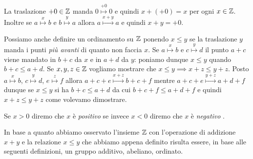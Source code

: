 La traslazione $+0\in {\mathbb Z}$ manda $0\stackrel{+0}\mapsto 0$ 
e quindi $x+(+0)=x$ per ogni $x\in {\mathbb Z}$.
Inoltre se $a\stackrel x\mapsto b$ e $b\stackrel y \mapsto a$ 
allora $a \stackrel{x+y} \mapsto a$ e quindi $x+y = +0$.

Possiamo anche definire un ordinamento su ${\mathbb Z}$ ponendo $x\le y$ 
se la traslazione $y$ manda i punti \emph{più avanti} di quanto 
non faccia $x$. 
Se $a\stackrel x\mapsto b$ e $c\stackrel y\mapsto d$ 
il punto $a+c$ viene mandato in $b+c$ da $x$ e in $a+d$ da $y$:
poniamo dunque $x\le y$ quando $b+c\le a+d$.
Se $x,y,z\in {\mathbb Z}$ vogliamo mostrare 
che $x\le y \implies x+z\le y+z$.
Posto $a\stackrel x\mapsto b$, $c\stackrel y\mapsto d$, 
$e\stackrel z\mapsto f$ 
allora $a+c+e \stackrel{x+z} \mapsto b + c+f$ 
mentre $a+c+e \stackrel{y+z} \mapsto a+d+f$ dunque 
se $x\le y$ si ha $b+c \le a+d$ da cui $b+c+f \le a+d+f$
e quindi $x+z \le y+z$ come volevamo dimostrare.

Se $x>0$ diremo che $x$ è \emph{positivo}%
%
se invece $x<0$ diremo che $x$ è \emph{negativo}%
%
.

In base a quanto abbiamo osservato l'insieme ${\mathbb Z}$ con l'operazione 
di addizione $x+y$ e la relazione $x\le y$ che abbiamo appena definito 
risulta essere, in base alle seguenti definizioni, 
un gruppo additivo, abeliano, ordinato.

